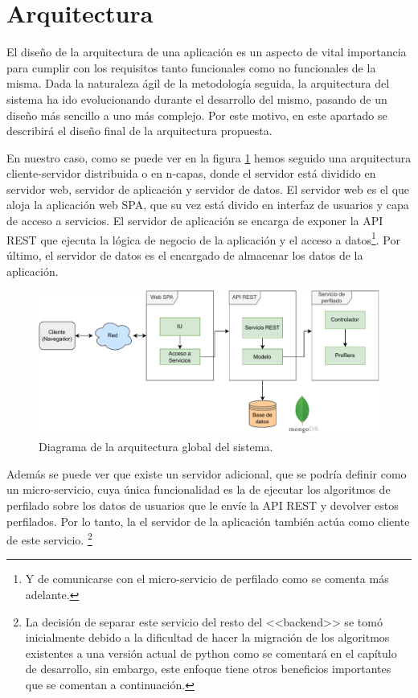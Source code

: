 \section{Arquitectura}
El diseño de la arquitectura de una aplicación es un aspecto de vital importancia para cumplir con los requisitos tanto funcionales como no funcionales de la misma. Dada la naturaleza ágil de la metodología seguida, la arquitectura del sistema ha ido evolucionando durante el desarrollo del mismo, pasando de un diseño más sencillo a uno más complejo. Por este motivo, en este apartado se describirá el diseño final de la arquitectura propuesta.

En nuestro caso, como se puede ver en la figura \ref{fig:diagrama/arquitectura} hemos seguido una arquitectura cliente-servidor distribuida o en n-capas, donde el servidor está dividido en servidor web, servidor de aplicación y servidor de datos. El servidor web es el que aloja la aplicación web SPA, que su vez está divido en interfaz de usuarios y capa de acceso a servicios. El servidor de aplicación se encarga de exponer la API REST que ejecuta la lógica de negocio de la aplicación y el acceso a datos\footnote{Y de comunicarse con el micro-servicio de perfilado como se comenta más adelante.}. Por último, el servidor de datos es el encargado de almacenar los datos de la aplicación. 

\begin{figure}[H]
  \centering
  \includegraphics[width=\textwidth]{imaxes/diagramas/arquitectura.pdf}
  \caption{Diagrama de la arquitectura global del sistema.}  \label{fig:diagrama/arquitectura}
\end{figure}

Además se puede ver que existe un servidor adicional, que se podría definir como un micro-servicio, cuya única funcionalidad es la de ejecutar los algoritmos de perfilado sobre los datos de usuarios que le envíe la API REST y devolver estos perfilados. Por lo tanto, la el servidor de la aplicación también actúa como cliente de este servicio. \footnote{La decisión de separar este servicio del resto del <<backend>> se tomó inicialmente debido a la dificultad de hacer la migración de los algoritmos existentes a una versión actual de python como se comentará en el capítulo de desarrollo, sin embargo, este enfoque tiene otros beneficios importantes que se comentan a continuación.}

